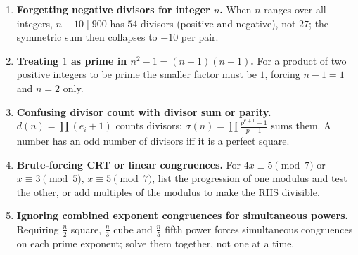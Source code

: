 \documentclass[11pt,a4paper]{article}
\begin{document}
\begin{enumerate}[leftmargin=2em, itemsep=4pt]
  \item \textbf{Forgetting negative divisors for integer $n$.}
        When $n$ ranges over all integers, $n+10\mid900$ has $54$ divisors (positive and negative), not $27$; the symmetric sum then collapses to $-10$ per pair. 
  \item \textbf{Treating $1$ as prime in $n^{2}-1=(n-1)(n+1)$.}
        For a product of two positive integers to be prime the smaller factor must be $1$, forcing $n-1=1$ and $n=2$ only. 
  \item \textbf{Confusing divisor count with divisor sum or parity.}
        $d(n)=\prod(e_{i}+1)$ counts divisors; $\sigma(n)=\prod\frac{p^{e+1}-1}{p-1}$ sums them. A number has an odd number of divisors iff it is a perfect square. 
  \item \textbf{Brute-forcing CRT or linear congruences.}
        For $4x\equiv5\pmod7$ or $x\equiv3\pmod5,\,x\equiv5\pmod7$, list the progression of one modulus and test the other, or add multiples of the modulus to make the RHS divisible. 
  \item \textbf{Ignoring combined exponent congruences for simultaneous powers.}
        Requiring $\frac{n}{2}$ square, $\frac{n}{3}$ cube and $\frac{n}{5}$ fifth power forces simultaneous congruences on each prime exponent; solve them together, not one at a time. 
\end{enumerate}

\end{document}
